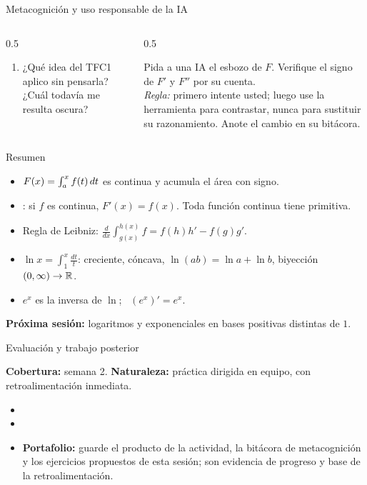 \documentclass[10pt,aspectratio=169]{beamer}
\begin{document}
\begin{frame}{Metacognición y uso responsable de la IA}
  \small
  \begin{columns}[t]
    \begin{column}{0.5\textwidth}
      \begin{metacog}
        \begin{enumerate}
          \metacomun
          \item ¿Qué idea del TFC1 aplico sin pensarla? ¿Cuál todavía me resulta oscura?
        \end{enumerate}
      \end{metacog}
    \end{column}
    \begin{column}{0.5\textwidth}
      \begin{iabox}
        Pida a una IA el esbozo de $F$. Verifique el signo de $F'$ y $F''$ por su cuenta.\\[2pt]
        \textit{Regla:} primero intente usted; luego use la herramienta para contrastar, nunca para sustituir su razonamiento. Anote el cambio en su bitácora.
      \end{iabox}
    \end{column}
  \end{columns}
\end{frame}

\begin{frame}{Resumen}
  \begin{itemize}
    \item $F(x)=\int_a^xf(t)\,dt$ es continua y acumula el área con signo.
    \item {}: si $f$ es continua, $F'(x)=f(x)$. Toda función continua tiene primitiva.
    \item Regla de Leibniz: $\frac{d}{dx}\int_{g(x)}^{h(x)}f=f(h)h'-f(g)g'$.
    \item $\ln x=\int_1^x\frac{dt}{t}$: creciente, cóncava, $\ln(ab)=\ln a+\ln b$, biyección $(0,\infty)\to\mathbb{R}$.
    \item $e^x$ es la inversa de $\ln$; \ $(e^x)'=e^x$.
  \end{itemize}
  \vspace{3mm}
  \textbf{Próxima sesión:} logaritmos y exponenciales en bases positivas distintas de $1$.
\end{frame}


\begin{frame}{Evaluación y trabajo posterior}
  \small
  \begin{evalbox}
    \textbf{Cobertura:} semana 2. \textbf{Naturaleza:} práctica dirigida en equipo, con retroalimentación inmediata.
  \end{evalbox}
  \begin{itemize}
    \item \criterios
    \item \declaracionia
    \item \textbf{Portafolio:} guarde el producto de la actividad, la bitácora de metacognición y los ejercicios propuestos de esta sesión; son evidencia de progreso y base de la retroalimentación.
  \end{itemize}
\end{frame}
\end{document}

